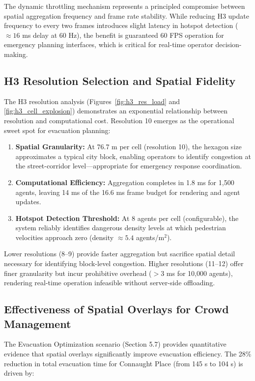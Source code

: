 \documentclass[12pt,a4paper,oneside]{report}
\begin{document}
The dynamic throttling mechanism represents a principled compromise between spatial aggregation frequency and frame rate stability. While reducing H3 update frequency to every two frames introduces slight latency in hotspot detection ($\approx 16$ ms delay at 60 Hz), the benefit is guaranteed 60 FPS operation for emergency planning interfaces, which is critical for real-time operator decision-making.

\subsection{H3 Resolution Selection and Spatial Fidelity}
The H3 resolution analysis (Figures~\ref{fig:h3_res_load} and \ref{fig:h3_cell_explosion}) demonstrates an exponential relationship between resolution and computational cost. Resolution 10 emerges as the operational sweet spot for evacuation planning:

\begin{enumerate}
    \item \textbf{Spatial Granularity:} At 76.7 m per cell (resolution 10), the hexagon size approximates a typical city block, enabling operators to identify congestion at the street-corridor level—appropriate for emergency response coordination.
    \item \textbf{Computational Efficiency:} Aggregation completes in 1.8 ms for 1,500 agents, leaving 14 ms of the 16.6 ms frame budget for rendering and agent updates.
    \item \textbf{Hotspot Detection Threshold:} At 8 agents per cell (configurable), the system reliably identifies dangerous density levels at which pedestrian velocities approach zero (density $\approx 5.4$ agents/m$^2$).
\end{enumerate}

Lower resolutions (8--9) provide faster aggregation but sacrifice spatial detail necessary for identifying block-level congestion. Higher resolutions (11--12) offer finer granularity but incur prohibitive overhead ($>3$ ms for 10,000 agents), rendering real-time operation infeasible without server-side offloading.

\subsection{Effectiveness of Spatial Overlays for Crowd Management}
The Evacuation Optimization scenario (Section 5.7) provides quantitative evidence that spatial overlays significantly improve evacuation efficiency. The 28\% reduction in total evacuation time for Connaught Place (from 145 s to 104 s) is driven by:
\end{document}
